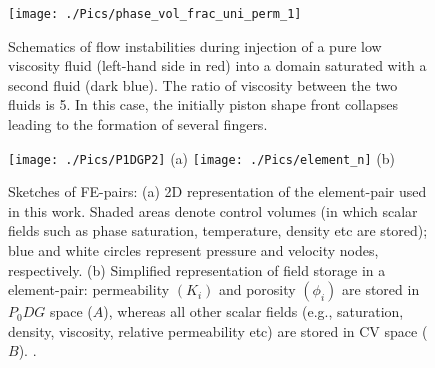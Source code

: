 




\begin{figure}[ht]
\centering
\vbox{\texttt{[image: ./Pics/phase\_vol\_frac\_uni\_perm\_1]}}
\caption{Schematics of flow instabilities during injection of a pure low viscosity fluid (left-hand side in red) into a domain saturated with a second fluid (dark blue). The ratio of viscosity between the two fluids is 5. In this case, the initially piston shape front collapses leading to the formation of several fingers.}
\label{fig:simple_case}
\end{figure}
\clearpage



\begin{figure}[ht] 
\vbox{
\hbox{\hspace{1cm}\texttt{[image: ./Pics/P1DGP2]}}
\hbox{\hspace{6cm}(a)}
\vspace{.5cm}
\hbox{\hspace{1cm}\texttt{[image: ./Pics/element\_n]}}
\hbox{\hspace{6cm}(b)}}
\caption{Sketches of FE-pairs: (a) 2D representation of the  element-pair used in this work. Shaded areas denote control volumes (in which scalar fields such as phase saturation, temperature, density etc are stored); blue and white circles represent pressure and velocity nodes, respectively. (b) Simplified representation of field storage in a  element-pair: permeability $\left(K_{i}\right)$ and porosity $\left(\phi_{i}\right)$ are stored in $P_{0}DG$ space ($A$), whereas all other scalar fields (e.g., saturation, density, viscosity, relative permeability etc) are stored in CV space ($B$). .}
\label{fig:fem_cv}
\end{figure}

